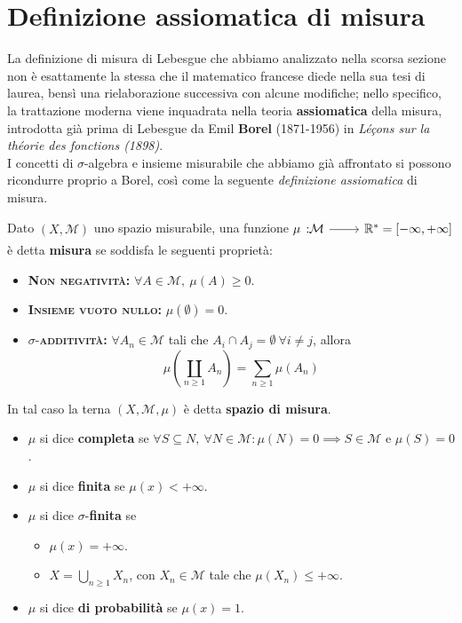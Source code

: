 \section{Definizione assiomatica di misura}
La definizione di misura di Lebesgue che abbiamo analizzato nella scorsa sezione non è esattamente la stessa che il matematico francese diede nella sua tesi di laurea, bensì una rielaborazione successiva con alcune modifiche; nello specifico, la trattazione moderna viene inquadrata nella teoria \textbf{assiomatica} della misura, introdotta già prima di Lebesgue da Emil \textbf{Borel} (1871-1956) in \textit{Léçons sur la théorie des fonctions (1898)}.\\
I concetti di $\sigma$-algebra e insieme misurabile che abbiamo già affrontato si possono ricondurre proprio a Borel, così come la seguente \textit{definizione assiomatica} di misura.
\begin{define}
	Dato $\left(X,\mathcal{M}\right)$ uno spazio misurabile, una funzione $\funz{\mu}{\mathcal{M}}{\realset^{\ast}=\left[-\infty,+\infty\right]}$ è detta \textbf{misura} se soddisfa le seguenti proprietà:
	\begin{itemize}
		\item \textsc{\textbf{Non negatività:}} $\forall A\in\mathcal{M},\ \mu\left(A\right)\geq 0$.
		\item \textsc{\textbf{Insieme vuoto nullo:}} $\mu\left(\emptyset\right)=0$.
		\item $\sigma$-\textsc{\textbf{additività:}} $\forall A_n\in\mathcal{M}$ tali che $A_i\cap A_j=\emptyset\ \forall i\neq j$, allora
		\begin{equation}
			\mu\left(\coprod_{n\geq 1}A_n\right)=\sum_{n\geq 1}\mu\left(A_n\right)
		\end{equation}
	\end{itemize}
	In tal caso la terna $\left(X,\mathcal{M},\mu\right)$ è detta \textbf{spazio di misura}.
	\begin{itemize}
		\item $\mu$ si dice \textbf{completa} se $\forall S\subseteq N,\ \forall N\in\mathcal{M}\colon\mu(N)=0\implies S\in\mathcal{M}$ e $\mu(S)=0$.
		\item $\mu$ si dice \textbf{finita} se $\mu(x)<+\infty$.
		\item $\mu$ si dice $\sigma$-\textbf{finita} se
		\begin{itemize}
			\item $\mu(x)=+\infty$.
			\item $\displaystyle X=\bigcup_{n\geq 1}X_n$, con $X_n\in\mathcal{M}$ tale che $\mu\left(X_n\right)\leq +\infty$.
		\end{itemize}
	\item $\mu$ si dice \textbf{di probabilità} se $\mu(x)=1$.
	\end{itemize}
\end{define}
